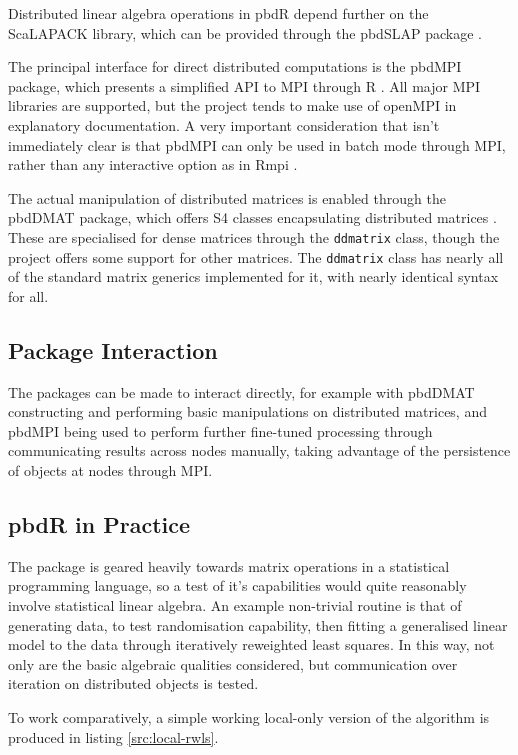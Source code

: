 \documentclass[a4paper,10pt]{article}
\begin{document}
Distributed linear algebra operations in pbdR depend further on the ScaLAPACK
library, which can be provided through the pbdSLAP package \cite{Chen2012pbdSLAPpackage}.

The principal interface for direct distributed computations is the pbdMPI
package, which presents a simplified API to MPI through R
\cite{Chen2012pbdMPIpackage}.  All major MPI libraries are supported, but the
project tends to make use of openMPI in explanatory documentation. A very
important consideration that isn't immediately clear  is that pbdMPI can only
be used in batch mode through MPI, rather than any interactive option as in
Rmpi \cite{yu02:_rmpi}.

The actual manipulation of distributed matrices is enabled through the pbdDMAT
package, which offers S4 classes encapsulating distributed matrices
\cite{pbdDMATpackage}. These are specialised for dense matrices through the
\texttt{ddmatrix} class, though the project offers some support for other
matrices. The \texttt{ddmatrix} class has nearly all of the standard matrix
generics implemented for it, with nearly identical syntax for all.

\subsection{Package Interaction}

The packages can be made to interact directly, for example with pbdDMAT
constructing and performing basic manipulations on distributed matrices, and
pbdMPI being used to perform further fine-tuned processing through
communicating results across nodes manually, taking advantage of the
persistence of objects at nodes through MPI.

\subsection{pbdR in Practice}

The package is geared heavily towards matrix operations in a statistical
programming language, so a test of it's capabilities would quite reasonably
involve statistical linear algebra. An example non-trivial routine is that of
generating data, to test randomisation capability, then fitting a generalised
linear model to the data through iteratively reweighted least squares. In this
way, not only are the basic algebraic qualities considered, but communication
over iteration on distributed objects is tested.

To work comparatively, a simple working local-only version of the algorithm is
produced in listing \ref{src:local-rwls}.
\end{document}
